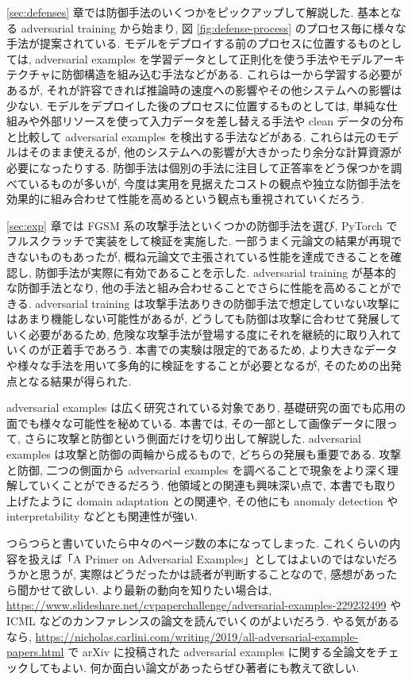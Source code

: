 \ref{sec:defenses} 章では防御手法のいくつかをピックアップして解説した.
基本となる adversarial training から始まり, 図 \ref{fig:defense-process} のプロセス毎に様々な手法が提案されている.
モデルをデプロイする前のプロセスに位置するものとしては, adversarial examples を学習データとして正則化を使う手法やモデルアーキテクチャに防御構造を組み込む手法などがある.
これらは一から学習する必要があるが, それが許容できれば推論時の速度への影響やその他システムへの影響は少ない.
モデルをデプロイした後のプロセスに位置するものとしては, 単純な仕組みや外部リソースを使って入力データを差し替える手法や clean データの分布と比較して adversarial examples を検出する手法などがある.
これらは元のモデルはそのまま使えるが, 他のシステムへの影響が大きかったり余分な計算資源が必要になったりする.
防御手法は個別の手法に注目して正答率をどう保つかを調べているものが多いが, 今度は実用を見据えたコストの観点や独立な防御手法を効果的に組み合わせて性能を高めるという観点も重視されていくだろう.

\ref{sec:exp} 章では FGSM 系の攻撃手法といくつかの防御手法を選び, PyTorch でフルスクラッチで実装をして検証を実施した.
一部うまく元論文の結果が再現できないものもあったが, 概ね元論文で主張されている性能を達成できることを確認し, 防御手法が実際に有効であることを示した.
adversarial training が基本的な防御手法となり, 他の手法と組み合わせることでさらに性能を高めることができる.
adversarial training は攻撃手法ありきの防御手法で想定していない攻撃にはあまり機能しない可能性があるが, どうしても防御は攻撃に合わせて発展していく必要があるため, 危険な攻撃手法が登場する度にそれを継続的に取り入れていくのが正着手であろう.
本書での実験は限定的であるため, より大きなデータや様々な手法を用いて多角的に検証をすることが必要となるが, そのための出発点となる結果が得られた.

adversarial examples は広く研究されている対象であり, 基礎研究の面でも応用の面でも様々な可能性を秘めている.
本書では, その一部として画像データに限って, さらに攻撃と防御という側面だけを切り出して解説した.
adversarial examples は攻撃と防御の両輪から成るもので, どちらの発展も重要である.
攻撃と防御, 二つの側面から adversarial examples を調べることで現象をより深く理解していくことができるだろう.
他領域との関連も興味深い点で, 本書でも取り上げたように domain adaptation との関連や, その他にも anomaly detection や interpretability などとも関連性が強い.

つらつらと書いていたら中々のページ数の本になってしまった.
これくらいの内容を扱えば「A Primer on Adversarial Examples」としてはよいのではないだろうかと思うが, 実際はどうだったかは読者が判断することなので, 感想があったら聞かせて欲しい.
より最新の動向を知りたい場合は, \href{https://www.slideshare.net/cvpaperchallenge/adversarial-examples-229232499}{https://www.slideshare.net/cvpaperchallenge/adversarial-examples-229232499} や ICML などのカンファレンスの論文を読んでいくのがよいだろう.
やる気があるなら, \href{https://nicholas.carlini.com/writing/2019/all-adversarial-example-papers.html}{https://nicholas.carlini.com/writing/2019/all-adversarial-example-papers.html} で arXiv に投稿された adversarial examples に関する全論文をチェックしてもよい.
何か面白い論文があったらぜひ著者にも教えて欲しい.
